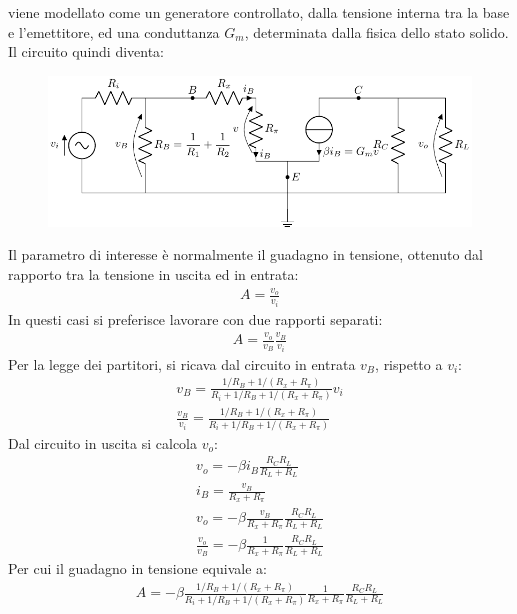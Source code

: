 \documentclass{article}
\numberwithin{equation}{subsection}
\begin{document}
viene modellato come un generatore controllato, dalla tensione interna tra la base e l'emettitore, ed una conduttanza $G_m$, determinata dalla fisica 
dello stato solido. 
Il circuito quindi diventa:
\begin{figure}[H]%
    \centering
    \includegraphics{bjt-piccoli-segnali-due-porte.pdf}%
    \label{fig:bjt-piccoli-segnali-due-porte}
\end{figure}

Il parametro di interesse è normalmente il guadagno in tensione, ottenuto dal rapporto tra la tensione in uscita ed in entrata:
\begin{gather*}
    A=\displaystyle\frac{v_o}{v_i}
\end{gather*}
In questi casi si preferisce lavorare con due rapporti separati:
\begin{gather*}
    A=\displaystyle\frac{v_o}{v_B}\frac{v_B}{v_i}
\end{gather*}
Per la legge dei partitori, si ricava dal circuito in entrata $v_B$, rispetto a $v_i$:
\begin{gather*}
    v_B=\displaystyle\frac{1/R_B+1/(R_x+R_\pi)}{R_i+1/R_B+1/(R_x+R_\pi)}v_i\\
    \displaystyle\frac{v_B}{v_i}=\frac{1/R_B+1/(R_x+R_\pi)}{R_i+1/R_B+1/(R_x+R_\pi)}
\end{gather*}
Dal circuito in uscita si calcola $v_o$:
\begin{gather*}
    v_o=-\beta i_B\displaystyle\frac{R_CR_L}{R_L+R_L}\\
    i_B=\displaystyle\frac{v_B}{R_x+R_\pi}\\
    v_o=-\beta\displaystyle\frac{v_B}{R_x+R_\pi}\frac{R_CR_L}{R_L+R_L}\\
    \displaystyle\frac{v_o}{v_B}=-\beta\displaystyle\frac{1}{R_x+R_\pi}\frac{R_CR_L}{R_L+R_L}
\end{gather*}
Per cui il guadagno in tensione equivale a:
\begin{gather*}
    A=-\beta\displaystyle\frac{1/R_B+1/(R_x+R_\pi)}{R_i+1/R_B+1/(R_x+R_\pi)}\frac{1}{R_x+R_\pi}\frac{R_CR_L}{R_L+R_L}
\end{gather*}
\end{document}
